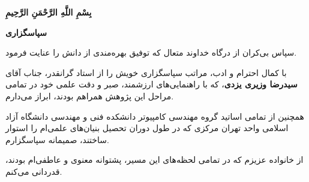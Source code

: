 \documentclass[a4paper,14pt]{extreport}
\begin{document}
\pagestyle{empty}       %



\newpage
\thispagestyle{empty}
\vspace*{\fill}
\begin{center}
{\Huge\bfseries بِسْمِ اللَّهِ الرَّحْمَنِ الرَّحِیمِ}
\end{center}
\vspace*{\fill}
\newpage


\newpage
\thispagestyle{empty}
\begin{center}
{\Large\bfseries سپاسگزاری}
\end{center}
\vspace{1.5cm}

{\normalsize
سپاس بی‌کران از درگاه خداوند متعال که توفیق بهره‌مندی از دانش را عنایت فرمود.

با کمال احترام و ادب، مراتب سپاسگزاری خویش را از استاد گرانقدر، جناب آقای \textbf{سیدرضا وزیری یزدی}، که با راهنمایی‌های ارزشمند، صبر و دقت علمی خود در تمامی مراحل این پژوهش همراهم بودند، ابراز می‌دارم.

همچنین از تمامی اساتید گروه مهندسی کامپیوتر دانشکده فنی و مهندسی دانشگاه آزاد اسلامی واحد تهران مرکزی که در طول دوران تحصیل بنیان‌های علمی‌ام را استوار ساختند، صمیمانه سپاسگزارم.

از خانواده عزیزم که در تمامی لحظه‌های این مسیر، پشتوانه معنوی و عاطفی‌ام بودند، قدردانی می‌کنم.
}
\end{document}
